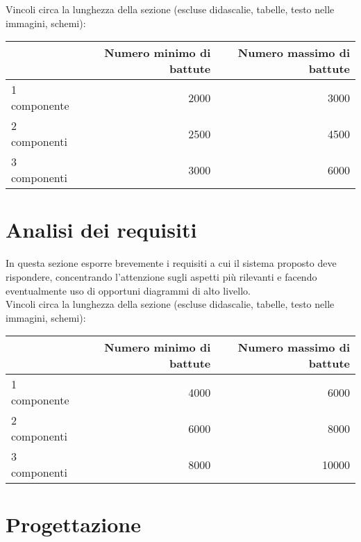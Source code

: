 \documentclass[12pt]{article}
\begin{document}
Vincoli circa la lunghezza della sezione (escluse didascalie, tabelle, testo nelle immagini, schemi):

\vspace{1cm}
\begin{tabular}{l|rr}
 & Numero minimo di battute & Numero massimo di battute \\
 \hline
 1 componente & 2000 & 3000 \\
 2 componenti & 2500 & 4500 \\
 3 componenti & 3000 & 6000 \\
 \hline
\end{tabular}


\newpage



\section{Analisi dei requisiti}

In questa sezione esporre brevemente i requisiti a cui il sistema proposto deve rispondere, concentrando l'attenzione sugli aspetti più rilevanti e facendo eventualmente uso di opportuni diagrammi di alto livello.\\

Vincoli circa la lunghezza della sezione (escluse didascalie, tabelle, testo nelle immagini, schemi):

\vspace{1cm}
\begin{tabular}{l|rr}
 & Numero minimo di battute & Numero massimo di battute \\
 \hline
 1 componente & 4000 & 6000 \\
 2 componenti & 6000 & 8000 \\
 3 componenti & 8000 & 10000 \\
 \hline
\end{tabular}


\newpage



\section{Progettazione}
\end{document}

